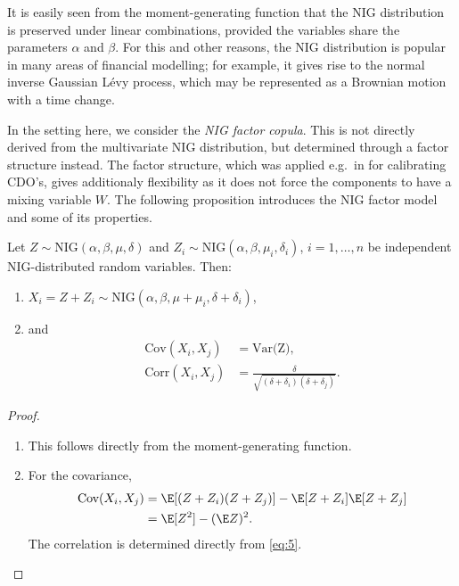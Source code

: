 It is easily seen from the moment-generating function that the NIG distribution is preserved under linear combinations, provided
the variables share the parameters $\alpha$ and $\beta$. For this
and other reasons, the NIG distribution is popular in many areas of
financial modelling; for example, it gives rise 
to the normal inverse Gaussian L\'evy process, which may be represented
as a Brownian motion with a time change.

In the setting here, we consider the {\em NIG factor copula}. This is
not directly derived from the multivariate NIG distribution, but
determined through a factor structure instead. The factor structure,
which 
was applied e.g.\ in \citep{Kalemanova2007} for calibrating CDO's,
gives additionaly flexibility as it does not force the components to
have a mixing variable $W$.
The following proposition introduces the NIG factor model and some of
its properties.
\begin{proposition}
  \label{prop:NIG}
  Let $Z\sim \text{NIG}(\alpha, \beta, \mu, \delta)$ and
  $Z_i\sim \text{NIG}(\alpha, \beta, \mu_i, \delta_i)$,
  $i=1,\ldots, n$ be independent NIG-distributed random
  variables. Then:
  \begin{enumerate}
  \item  $X_i = Z + Z_i\sim \text{NIG}(\alpha,\beta,\mu+\mu_i,
  \delta+\delta_i)$,
\item and 
  \begin{align}
    \text{Cov}(X_i,X_j) &= \text{Var(Z)},\nonumber\\
    \text{Corr}(X_i,X_j) &= \frac{\delta}{\sqrt{(\delta+\delta_i)
                           (\delta+\delta_j)}}. \label{eq:6}
  \end{align}
\end{enumerate}
\end{proposition}
\begin{proof}
  \begin{enumerate}
  \item This follows directly from the moment-generating function. 
  \item For the covariance,
    \begin{align*}
      \text{Cov}(X_i,X_j)
      &= \E[(Z+Z_i) (Z+Z_j)] - \E[Z+Z_i] \E[Z+Z_j]\\
      &= \E[Z^2] -(\E Z)^2.
    \end{align*}
    The correlation is determined directly from \eqref{eq:5}. 
  \end{enumerate}
\end{proof}

